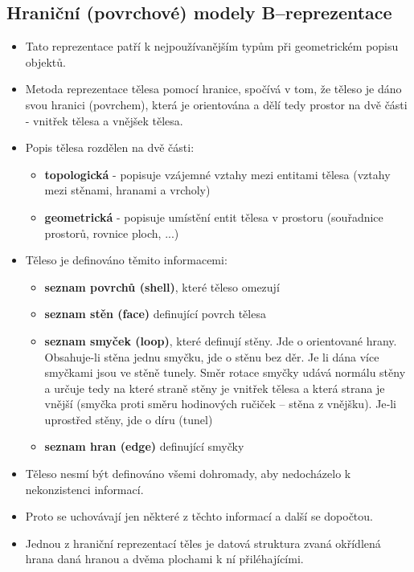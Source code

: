  \subsection{Hraniční (povrchové) modely B--reprezentace}
 \begin{itemize}
 	\item Tato reprezentace patří k nejpoužívanějším typům při geometrickém popisu objektů.
 	\item Metoda reprezentace tělesa pomocí hranice, spočívá v tom, že těleso je dáno svou hranici (povrchem), která je orientována a dělí tedy prostor na dvě části - vnitřek tělesa a vnějšek tělesa.
 	\item Popis tělesa rozdělen na dvě části:
 	\begin{itemize}
		\item \textbf{topologická} - popisuje vzájemné vztahy mezi entitami tělesa (vztahy mezi stěnami, hranami a vrcholy)
		\item \textbf{geometrická} - popisuje umístění entit tělesa v prostoru (souřadnice prostorů, rovnice ploch, ...)
 	\end{itemize}
 	\item Těleso je definováno těmito informacemi:
 	\begin{itemize}
		\item	\textbf{seznam povrchů (shell)}, které těleso omezují
		\item	\textbf{seznam stěn (face)} definující povrch tělesa
		\item	\textbf{seznam smyček (loop)}, které definují stěny. Jde o orientované hrany. Obsahuje-li stěna jednu smyčku, jde o stěnu bez děr. Je li dána více smyčkami jsou ve stěně tunely. Směr rotace smyčky udává 	normálu stěny a určuje tedy na které straně stěny je vnitřek tělesa a která strana je vnější (smyčka proti směru hodinových ručiček – stěna z vnějšku). Je‑li uprostřed stěny, jde o díru (tunel)
		\item	\textbf{seznam hran (edge)} definující smyčky
 	\end{itemize}
 	\item Těleso nesmí být definováno všemi dohromady, aby nedocházelo k nekonzistenci informací.
 	\item Proto se uchovávají jen některé z těchto informací a další se dopočtou.
 	\item Jednou z hraniční reprezentací těles je datová struktura zvaná okřídlená hrana daná hranou a dvěma plochami k ní přiléhajícími.
 \end{itemize}


